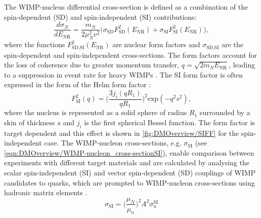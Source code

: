 The WIMP-nucleus differential cross-section is defined as a combination of the spin-dependent (SD) and spin-independent (SI) contributions:
\begin{equation}
    \frac{d\sigma_N}{dE_\text{NR}}=\frac{m_N}{2\mu^2_Nv^2}\biggl(\sigma_\text{SD}F_\text{SD}^2(E_\text{NR})+\sigma_\text{SI}F_\text{SI}^2(E_\text{NR})\biggl),
\end{equation}
where the functions $F_\text{SD,SI}^2(E_\text{NR})$ are nuclear form factors and $\sigma_\text{SD,SI}$ are the spin-dependent and spin-independent cross-sections. The form factors account for the loss of coherence due to greater momentum transfer, $q=\sqrt{2m_NE_\text{NR}}$, leading to a suppression in event rate for heavy WIMPs \cite{Cerdeno:2010jj}. The SI form factor is often expressed in the form of the Helm form factor \cite{edfraser:thesis}:
\begin{equation}
    F_\text{SI}^2(q)=\biggl(\frac{3j_i(qR_1)}{qR_1}\biggl)^2\text{exp}(-q^2s^2),
\end{equation}
where the nucleus is represented as a solid sphere of radius $R_1$ surrounded by a skin of thickness $s$ and $j_i$ is the first spherical Bessel function. The form factor is target dependent and this effect is shown in \autoref{fig:DMOverview/SIFF} for the spin-independent case.
The WIMP-nucleon cross-sections, e.g. $\sigma_\text{SI}$ (see \autoref{eqn:DMOverview/WIMP-nucleon_cross-sectionSI}), enable comparison between experiments with different target materials and are calculated by analysing the scalar spin-independent (SI) and vector spin-dependent (SD) couplings of WIMP candidates to quarks, which are prompted to WIMP-nucleon cross-sections using hadronic matrix elements \cite{edfraser:thesis}.
\begin{equation}\label{eqn:DMOverview/WIMP-nucleon_cross-sectionSI}
    \sigma_\text{SI}=\biggl(\frac{\mu_N}{\mu_n}\biggl)^2A^2\sigma^\text{SI}_n
\end{equation}
